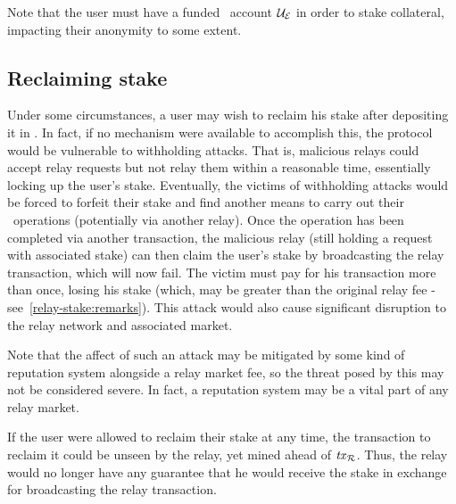 Note that the user must have a funded \ethereum~account $\mathcal{{U}_{E}}$ in order to stake collateral, impacting their anonymity to some extent.

\subsection{Reclaiming stake}\label{relay-stake:protocol-overview:reclaiming-stake}

Under some circumstances, a user may wish to reclaim his stake after depositing it in \stakecontract{}. In fact, if no mechanism were available to accomplish this, the protocol would be vulnerable to withholding attacks. That is, malicious relays could accept relay requests but not relay them within a reasonable time, essentially locking up the user's stake. Eventually, the victims of withholding attacks would be forced to forfeit their stake and find another means to carry out their \zeth~operations (potentially via another relay). Once the operation has been completed via another transaction, the malicious relay (still holding a request with associated stake) can then claim the user's stake by broadcasting the relay transaction, which will now fail. The victim must pay for his transaction more than once, losing his stake (which, may be greater than the original relay fee - see~\cref{relay-stake:remarks}). This attack would also cause significant disruption to the relay network and associated market.

\begin{notebox}
  Note that the affect of such an attack may be mitigated by some kind of reputation system alongside a relay market fee, so the threat posed by this may not be considered severe. In fact, a reputation system may be a vital part of any relay market.
\end{notebox}

If the user were allowed to reclaim their stake at any time, the transaction to reclaim it could be unseen by the relay, yet mined ahead of $\mathit{tx}_{\mathcal{R}}$. Thus, the relay would no longer have any guarantee that he would receive the stake in exchange for broadcasting the relay transaction.

